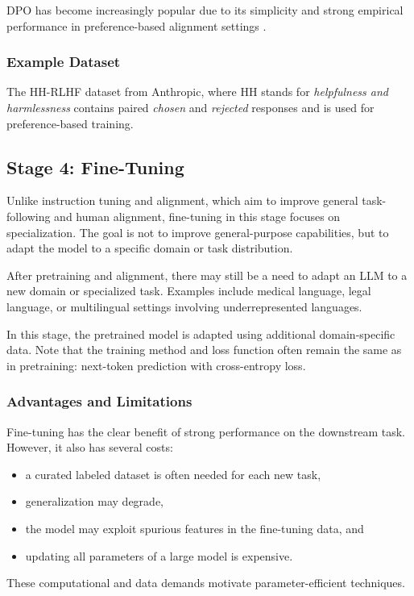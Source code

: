 \documentclass{article}
\begin{document}
DPO has become increasingly popular due to its simplicity and strong empirical performance in preference-based alignment settings \cite{rafailov2023direct}.

\subsubsection{Example Dataset}
The HH-RLHF dataset from Anthropic, where HH stands for \emph{helpfulness and harmlessness} contains paired \emph{chosen} and \emph{rejected} responses and is used for preference-based training.

\subsection{Stage 4: Fine-Tuning}

Unlike instruction tuning and alignment, which aim to improve general task-following and human alignment, fine-tuning in this stage focuses on specialization. The goal is not to improve general-purpose capabilities, but to adapt the model to a specific domain or task distribution.

After pretraining and alignment, there may still be a need to adapt an LLM to a new domain or specialized task. Examples include medical language, legal language, or multilingual settings involving underrepresented languages.

In this stage, the pretrained model is adapted using additional domain-specific data. Note that the training method and loss function often remain the same as in pretraining: next-token prediction with cross-entropy loss.

\subsubsection{Advantages and Limitations}
Fine-tuning has the clear benefit of strong performance on the downstream task. However, it also has several costs:
\begin{itemize}
    \item a curated labeled dataset is often needed for each new task,
    \item generalization may degrade,
    \item the model may exploit spurious features in the fine-tuning data, and
    \item updating all parameters of a large model is expensive.
\end{itemize}

These computational and data demands motivate parameter-efficient techniques.
\end{document}
